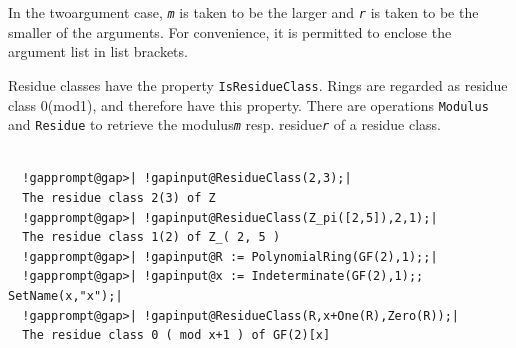 \documentclass[a4paper,11pt]{report}
\begin{document}
{{{ In the two\texttt{}argument case, \mbox{\texttt{\mdseries\slshape m}} is taken to be the larger and \mbox{\texttt{\mdseries\slshape r}} is taken to be the smaller of the arguments. For convenience, it is permitted
to enclose the argument list in list brackets. 

    Residue classes have the property \texttt{IsResidueClass}. Rings are regarded as residue class 0{\nobreakspace}(mod{\nobreakspace}1),
and therefore have this property. There are operations \texttt{Modulus} and \texttt{Residue} to retrieve the modulus{\nobreakspace}\mbox{\texttt{\mdseries\slshape m}} resp. residue{\nobreakspace}\mbox{\texttt{\mdseries\slshape r}} of a residue class. 
\begin{Verbatim}[commandchars=!@|,fontsize=\small,frame=single,label=Example]
  
  !gapprompt@gap>| !gapinput@ResidueClass(2,3);|
  The residue class 2(3) of Z
  !gapprompt@gap>| !gapinput@ResidueClass(Z_pi([2,5]),2,1);|
  The residue class 1(2) of Z_( 2, 5 )
  !gapprompt@gap>| !gapinput@R := PolynomialRing(GF(2),1);;|
  !gapprompt@gap>| !gapinput@x := Indeterminate(GF(2),1);; SetName(x,"x");|
  !gapprompt@gap>| !gapinput@ResidueClass(R,x+One(R),Zero(R));|
  The residue class 0 ( mod x+1 ) of GF(2)[x]
  
\end{Verbatim}
 }

 

}}
\end{document}
